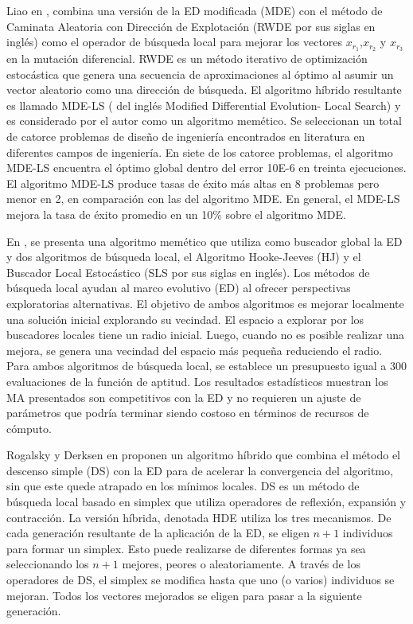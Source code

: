  Liao en \cite{liao2010two}, combina una versión de la ED modificada (MDE) con el método de Caminata Aleatoria con Dirección de Explotación (RWDE por sus siglas en inglés) como el operador de búsqueda local para mejorar los vectores $x_{r_1}$,$x_{r_2}$ y $x_{r_3}$ en la mutación diferencial. RWDE es un método iterativo de optimización estocástica que genera una secuencia de aproximaciones al óptimo al asumir un vector aleatorio como una dirección de búsqueda. El algoritmo híbrido resultante es llamado MDE-LS ( del inglés Modified Differential Evolution- Local Search) y es considerado por el autor como un algoritmo memético. Se seleccionan un total de catorce problemas de diseño de ingeniería encontrados en literatura en diferentes campos de ingeniería. En siete de los catorce problemas, el algoritmo MDE-LS encuentra el óptimo global dentro del error 10E-6 en treinta ejecuciones. El algoritmo MDE-LS produce tasas de éxito más altas en 8 problemas pero menor en 2, en comparación con las del algoritmo MDE. En general, el MDE-LS mejora la tasa de éxito promedio en un 10\% sobre el algoritmo MDE.



En \cite{neri2008memetic}, se presenta una algoritmo memético que utiliza como buscador global la ED y dos algoritmos de búsqueda local, el Algoritmo Hooke-Jeeves (HJ) y el Buscador Local Estocástico (SLS por sus siglas en inglés). Los métodos de búsqueda local ayudan al marco evolutivo (ED) al ofrecer perspectivas exploratorias alternativas. El objetivo de ambos algoritmos es mejorar localmente una solución inicial explorando su vecindad. El espacio a explorar por los buscadores locales tiene un radio inicial. Luego, cuando no es posible  realizar una mejora, se genera una vecindad del espacio más pequeña reduciendo el radio. Para ambos algoritmos de búsqueda local, se establece un presupuesto igual a 300 evaluaciones de la función de aptitud. Los resultados estadísticos muestran los MA presentados son competitivos con la ED y no requieren un ajuste de parámetros que podría terminar siendo costoso en términos de recursos de cómputo. 

Rogalsky y Derksen en \cite{rogalsky2000hybridization} proponen un algoritmo híbrido que combina el método el descenso simple (DS) con la ED para de acelerar la convergencia del algoritmo, sin que este quede atrapado en los mínimos locales.
DS es un método de búsqueda local basado en simplex que utiliza operadores de reflexión, expansión y contracción. La versión híbrida, denotada HDE utiliza los tres mecanismos.
De cada generación resultante de la aplicación de la ED, se eligen $ n + 1 $ individuos para formar un simplex. Esto puede realizarse de diferentes formas ya sea seleccionando los $n+1$ mejores, peores o aleatoriamente. A través de los operadores de DS, el simplex se modifica hasta que uno (o varios) individuos se mejoran. Todos los vectores mejorados se eligen para pasar a la siguiente generación. 

